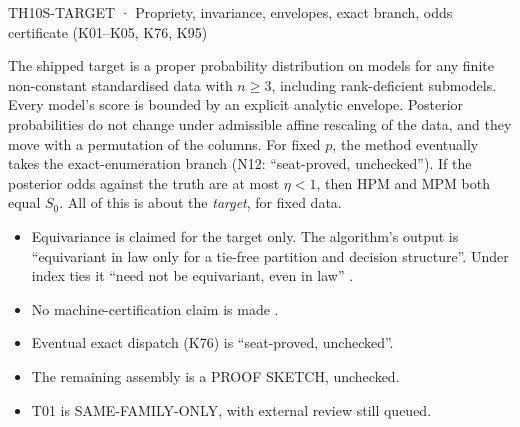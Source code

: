 \begin{card}{TH10}{S-TARGET · Propriety, invariance, envelopes, exact branch, odds certificate (K01–K05, K76, K95)}
\begin{plain}
The shipped target is a proper probability distribution on models for any finite non-constant standardised data with $n\ge 3$, including rank-deficient submodels. Every model's score is bounded by an explicit analytic envelope. Posterior probabilities do not change under admissible affine rescaling of the data, and they move with a permutation of the columns. For fixed $p$, the method eventually takes the exact-enumeration branch (N12: ``seat-proved, unchecked''). If the posterior odds against the truth are at most $\eta<1$, then HPM and MPM both equal $S_0$. All of this is about the \emph{target}, for fixed data.
\end{plain}
\begin{notproved}
\begin{itemize}
\item Equivariance is claimed for the target only. The algorithm's output is ``equivariant in law only for a tie-free partition and decision structure''. Under index ties it ``need not be equivariant, even in law'' .
\item No machine-certification claim is made .
\item Eventual exact dispatch (K76) is ``seat-proved, unchecked''.
\item The remaining assembly is a PROOF SKETCH, unchecked.
\item T01 is SAME-FAMILY-ONLY, with external review still queued.
\end{itemize}
\end{notproved}
\end{card}

